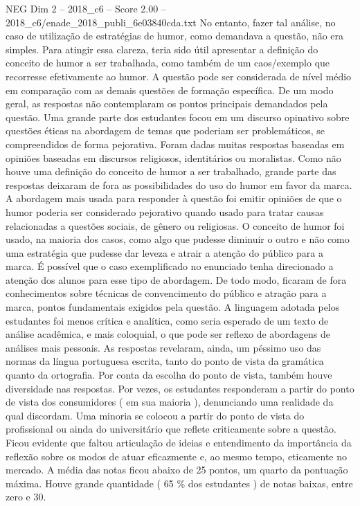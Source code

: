 \begin{textsample}{NEG Dim 2 – 2018\_c6 – Score 2.00 – 2018\_c6/enade\_2018\_publi\_6e03840cda.txt}
No entanto, fazer tal análise, no caso de utilização de estratégias de humor, como demandava a questão, não era simples.
Para atingir essa clareza, teria sido útil apresentar a definição do conceito de humor a ser trabalhada, como também de um caos/exemplo que recorresse efetivamente ao humor.
A questão pode ser considerada de nível médio em comparação com as demais questões de formação específica.
De um modo geral, as respostas não contemplaram os pontos principais demandados pela questão.
Uma grande parte dos estudantes focou em um discurso opinativo sobre questões éticas na abordagem de temas que poderiam ser problemáticos, se compreendidos de forma pejorativa.
Foram dadas muitas respostas baseadas em opiniões baseadas em discursos religiosos, identitários ou moralistas.
Como não houve uma definição do conceito de humor a ser trabalhado, grande parte das respostas deixaram de fora as possibilidades do uso do humor em favor da marca.
A abordagem mais usada para responder à questão foi emitir opiniões de que o humor poderia ser considerado pejorativo quando usado para tratar causas relacionadas a questões sociais, de gênero ou religiosas.
O conceito de humor foi usado, na maioria dos casos, como algo que pudesse diminuir o outro e não como uma estratégia que pudesse dar leveza e atrair a atenção do público para a marca.
É possível que o caso exemplificado no enunciado tenha direcionado a atenção dos alunos para esse tipo de abordagem.
De todo modo, ficaram de fora conhecimentos sobre técnicas de convencimento do público e atração para a marca, pontos fundamentais exigidos pela questão.
A linguagem adotada pelos estudantes foi menos crítica e analítica, como seria esperado de um texto de análise acadêmica, e mais coloquial, o que pode ser reflexo de abordagens de análises mais pessoais.
As respostas revelaram, ainda, um péssimo uso das normas da língua portuguesa escrita, tanto do ponto de vista da gramática quanto da ortografia.
Por conta da escolha do ponto de vista, também houve diversidade nas respostas.
Por vezes, os estudantes responderam a partir do ponto de vista dos consumidores ( em sua maioria ), denunciando uma realidade da qual discordam.
Uma minoria se colocou a partir do ponto de vista do profissional ou ainda do universitário que reflete criticamente sobre a questão.
Ficou evidente que faltou articulação de ideias e entendimento da importância da reflexão sobre os modos de atuar eficazmente e, ao mesmo tempo, eticamente no mercado.
A média das notas ficou abaixo de 25 pontos, um quarto da pontuação máxima.
Houve grande quantidade ( 65 \% dos estudantes ) de notas baixas, entre zero e 30.

\end{textsample}
